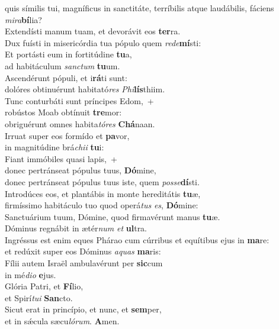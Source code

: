 \evenverse quis símilis tui, magníficus in sanctitáte, terríbilis atque laudábilis, fáciens \textit{mi}\textit{ra}\textbf{bí}lia?\\
\oddverse Extendísti manum tuam, et devorávit eos \textbf{ter}ra.~\*\\
\oddverse Dux fuísti in misericórdia tua pópulo quem \textit{re}\textit{de}\textbf{mí}sti:\\
\evenverse Et portásti eum in fortitúdine \textbf{tu}a,~\*\\
\evenverse ad habitáculum \textit{san}\textit{ctum} \textbf{tu}um.\\
\oddverse Ascendérunt pópuli, et i\textbf{rá}ti sunt:~\*\\
\oddverse dolóres obtinuérunt habitató\textit{res} \textit{Phi}\textbf{lís}thiim.\\
\evenverse Tunc conturbáti sunt príncipes Edom,~+\\
\evenverse  robústos Moab obtínuit \textbf{tre}mor:~\*\\
\evenverse obriguérunt omnes habita\textit{tó}\textit{res} \textbf{Chá}naan.\\
\oddverse Irruat super eos formído et \textbf{pa}vor,~\*\\
\oddverse in magnitúdine brá\textit{chi}\textit{i} \textbf{tu}i:\\
\evenverse Fiant immóbiles quasi lapis,~+\\
\evenverse  donec pertránseat pópulus tuus, \textbf{Dó}mine,~\*\\
\evenverse donec pertránseat pópulus tuus iste, quem \textit{pos}\textit{se}\textbf{dí}sti.\\
\oddverse Introdúces eos, et plantábis in monte hereditátis \textbf{tu}æ,~\*\\
\oddverse firmíssimo habitáculo tuo quod operá\textit{tus} \textit{es}, \textbf{Dó}mine:\\
\evenverse Sanctuárium tuum, Dómine, quod firmavérunt manus \textbf{tu}æ.~\*\\
\evenverse Dóminus regnábit in ætér\textit{num} \textit{et} \textbf{ul}tra.\\
\oddverse Ingréssus est enim eques Phárao cum cúrribus et equítibus ejus in \textbf{ma}re:~\*\\
\oddverse et redúxit super eos Dóminus \textit{a}\textit{quas} \textbf{ma}ris:\\
\evenverse Fílii autem Israël ambulavérunt per \textbf{sic}cum~\*\\
\evenverse in mé\textit{di}\textit{o} \textbf{e}jus.\\
\oddverse Glória Patri, et \textbf{Fí}lio,~\*\\
\oddverse et Spirí\textit{tu}\textit{i} \textbf{San}cto.\\
\evenverse Sicut erat in princípio, et nunc, et \textbf{sem}per,~\*\\
\evenverse et in sǽcula sæcu\textit{ló}\textit{rum}. \textbf{A}men.\\
